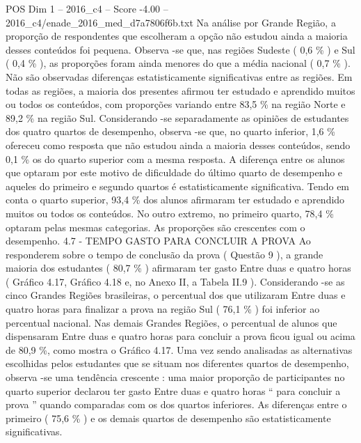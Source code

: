 \begin{textsample}{POS Dim 1 – 2016\_c4 – Score -4.00 – 2016\_c4/enade\_2016\_med\_d7a7806f6b.txt}
Na análise por Grande Região, a proporção de respondentes que escolheram a opção não estudou ainda a maioria desses conteúdos foi pequena.
Observa -se que, nas regiões Sudeste ( 0,6 \% ) e Sul ( 0,4 \% ), as proporções foram ainda menores do que a média nacional ( 0,7 \% ).
Não são observadas diferenças estatisticamente significativas entre as regiões.
Em todas as regiões, a maioria dos presentes afirmou ter estudado e aprendido muitos ou todos os conteúdos, com proporções variando entre 83,5 \% na região Norte e 89,2 \% na região Sul.
Considerando -se separadamente as opiniões de estudantes dos quatro quartos de desempenho, observa -se que, no quarto inferior, 1,6 \% ofereceu como resposta que não estudou ainda a maioria desses conteúdos, sendo 0,1 \% os do quarto superior com a mesma resposta.
A diferença entre os alunos que optaram por este motivo de dificuldade do último quarto de desempenho e aqueles do primeiro e segundo quartos é estatisticamente significativa.
Tendo em conta o quarto superior, 93,4 \% dos alunos afirmaram ter estudado e aprendido muitos ou todos os conteúdos.
No outro extremo, no primeiro quarto, 78,4 \% optaram pelas mesmas categorias.
As proporções são crescentes com o desempenho. 4.7 - TEMPO GASTO PARA CONCLUIR A PROVA Ao responderem sobre o tempo de conclusão da prova ( Questão 9 ), a grande maioria dos estudantes ( 80,7 \% ) afirmaram ter gasto Entre duas e quatro horas ( Gráfico 4.17, Gráfico 4.18 e, no Anexo II, a Tabela II.9 ).
Considerando -se as cinco Grandes Regiões brasileiras, o percentual dos que utilizaram Entre duas e quatro horas para finalizar a prova na região Sul ( 76,1 \% ) foi inferior ao percentual nacional.
Nas demais Grandes Regiões, o percentual de alunos que dispensaram Entre duas e quatro horas para concluir a prova ficou igual ou acima de 80,9 \%, como mostra o Gráfico 4.17.
Uma vez sendo analisadas as alternativas escolhidas pelos estudantes que se situam nos diferentes quartos de desempenho, observa -se uma tendência crescente : uma maior proporção de participantes no quarto superior declarou ter gasto Entre duas e quatro horas “ para concluir a prova ” quando comparadas com os dos quartos inferiores.
As diferenças entre o primeiro ( 75,6 \% ) e os demais quartos de desempenho são estatisticamente significativas.

\end{textsample}
